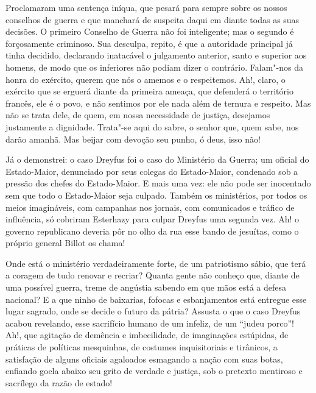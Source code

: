  Proclamaram uma sentença iníqua, que pesará para sempre sobre
os nossos conselhos de guerra e que manchará de suspeita daqui em diante todas as suas
decisões. O primeiro Conselho de Guerra não foi inteligente; mas o segundo é
forçosamente criminoso. Sua desculpa, repito, é que a autoridade
principal já tinha decidido, declarando inatacável o julgamento
anterior, santo e superior aos homens, de modo que os inferiores não
podiam dizer o contrário. Falam"-nos da honra do exército, querem
que nós o amemos e o respeitemos. Ah!, claro, o exército que se
erguerá diante da primeira ameaça, que defenderá o território
francês, ele é o povo, e não sentimos por ele nada além de ternura e
respeito. Mas não se trata dele, de quem, em nossa necessidade de justiça, desejamos justamente a dignidade. 
Trata"-se aqui do sabre, o senhor que, quem sabe, nos darão amanhã. Mas beijar com devoção seu punho, ó deus, isso não! 

Já o demonstrei: o caso Dreyfus foi o caso do Ministério da Guerra;
um oficial do Estado-Maior, denunciado por seus colegas do
Estado-Maior, condenado sob a pressão dos chefes do Estado-Maior.
E mais uma vez: ele não pode ser inocentado sem que todo o
Estado-Maior seja culpado. Também os ministérios, por todos os meios imagináveis,
com campanhas nos jornais, com comunicados e tráfico de
influência, só cobriram Esterhazy para culpar Dreyfus uma segunda vez. 
Ah! o governo republicano deveria pôr no olho da rua esse bando de jesuítas, 
como o próprio general Billot os chama!  

Onde está o ministério verdadeiramente forte, de um patriotismo sábio, 
que terá a coragem de tudo renovar e recriar? Quanta gente
não conheço que, diante de uma possível guerra, treme de angústia
sabendo em que mãos está a defesa nacional? E a que ninho de
baixarias, fofocas e esbanjamentos está entregue esse lugar sagrado,
onde se decide o futuro da pátria? Assusta o que o caso Dreyfus acabou
revelando, esse sacrifício humano de um infeliz, de um “judeu porco”!
Ah!, que agitação de demência e imbecilidade, de
imaginações estúpidas, de práticas de políticas mesquinhas, de costumes
inquisitoriais e tirânicos, a satisfação de alguns oficiais agaloados esmagando
a nação com suas botas, enfiando goela abaixo seu grito de verdade e justiça,
sob o pretexto mentiroso e sacrílego da razão de estado!

